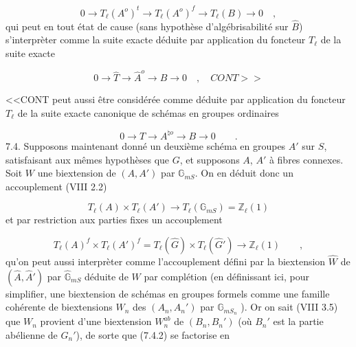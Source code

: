 \begin{equation}\tag{7.3.6}
0 \longrightarrow T_{\ell}(A^{o})^{t} \longrightarrow T_{\ell}(A^{o})^{f} \longrightarrow T_{\ell}(B) \longrightarrow 0 \quad ,
\end{equation}
qui peut en tout état de cause (sans hypothèse d'algébrisabilité sur $\hat{B}$) s'interprèter comme la suite exacte déduite par application du foncteur $T_{\ell}$ de la suite exacte

\begin{equation*}
0 \longrightarrow \hat{T} \longrightarrow \hat{A}^{o} \longrightarrow \hat{B} \longrightarrow 0 \quad , \quad CONT>>
\end{equation*}


<<CONT peut aussi être considérée comme déduite par application du foncteur $T_{\ell}$ de la suite exacte canonique de schémas en groupes ordinaires

\begin{equation*}
0 \longrightarrow T \longrightarrow A^{\natural o} \longrightarrow B \longrightarrow 0 \qquad .
\end{equation*}
7.4. Supposons maintenant donné un deuxième schéma en groupes $A'$ sur $S$, satisfaisant aux mêmes hypothèses que $G$, et supposons $A$, $A'$ à fibres connexes. Soit $W$ une biextension de $(A,A')$ par $\mathbb{G}_{mS}$. On en déduit donc un accouplement (VIII 2.2)

\begin{equation}\tag{7.4.1}
T_{\ell}(A) \times T_{\ell}(A') \longrightarrow T_{\ell}(\mathbb{G}_{mS}) = \mathbb{Z}_{\ell}(1)
\end{equation}
et par restriction aux parties fixes un accouplement

\begin{equation}\tag{7.4.2}
T_{\ell}(A)^{f} \times T_{\ell}(A')^{f} = T_{\ell}(\hat{G}) \times T_{\ell}(\hat{G}') \longrightarrow \mathbb{Z}_{\ell}(1) \qquad ,
\end{equation}
qu'on peut aussi interprèter comme l'accouplement défini par la biextension $\hat{W}$ de $(\hat{A},\hat{A}')$ par $\hat{\mathbb{G}}_{mS}$ déduite de $W$ par complétion (en définissant ici, pour simplifier, une biextension de schémas en groupes formels comme une famille cohérente de biextensions $W_{n}$ des $(A_{n},A_{n}')$ par $\mathbb{G}_{mS_{n}}$ ). Or on sait (VIII 3.5) que $W_{n}$ provient d'une biextension $W_{n}^{ab}$ de $(B_{n},B_{n}')$ (où $B_{n}'$ est la partie abélienne de $G_{n}'$), de sorte que (7.4.2) se factorise en

